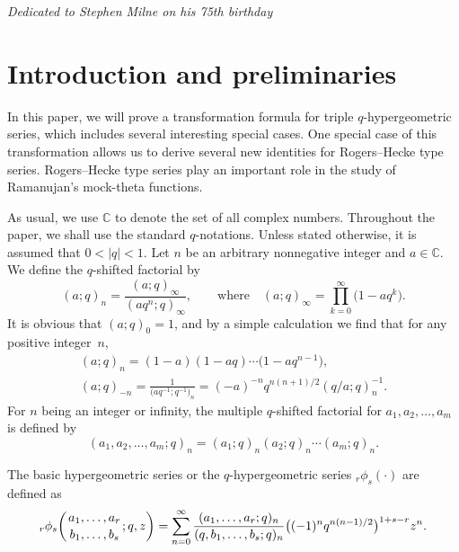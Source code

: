 \documentclass[pdftex]{sigma}
\numberwithin{equation}{section}
\begin{document}
\begin{flushright}
\emph{Dedicated to Stephen Milne on his 75th birthday}
\end{flushright}

\renewcommand{\thefootnote}{\arabic{footnote}}
\setcounter{footnote}{0}

\section{Introduction and preliminaries}

In this paper, we will prove a transformation formula for triple $q$-hypergeometric series, which includes several interesting special cases. One special case of this transformation allows us to derive several new identities for Rogers--Hecke type series. Rogers--Hecke type series play an important role in the study of Ramanujan's mock-theta functions.

As usual, we use $\mathbb{C}$ to denote the set of all complex numbers. Throughout the paper, we shall use the standard $q$-notations. Unless stated otherwise, it is assumed that $0<|q|<1$.
Let $n$ be an arbitrary nonnegative integer and $a \in \mathbb{C}$.
We define the $q$-shifted factorial by
\begin{equation*}
	(a;q)_n=\frac{(a; q)_\infty}{(aq^n; q)_\infty}, \qquad \text{where}\quad
	(a; q)_\infty=\prod_{k=0}^\infty \bigl(1-aq^k\bigr).
\end{equation*}
It is obvious that $(a; q)_0=1$, and by a simple calculation we find that for any positive integer~$n$,
\begin{gather*}
(a; q)_n=(1-a)(1-aq)\cdots \bigl(1-aq^{n-1}\bigr),\\
(a; q)_{-n}=\frac{1}{\bigl(aq^{-1}; q^{-1}\bigr)_n}=(-a)^{-n} q^{n(n+1)/2} (q/a; q)_n^{-1}.
\end{gather*}
For $n$ being an integer or infinity, the multiple
$q$-shifted factorial for $a_1, a_2, \ldots, a_m $ is defined by
\begin{equation*}
(a_1, a_2,\dots ,a_m;q)_n=(a_1;q)_n(a_2;q)_n \cdots (a_m;q)_n.
\end{equation*}

The basic hypergeometric series or the $q$-hypergeometric series ${_{r}\phi_s}(\cdot)$ are defined as
\begin{equation*}
_{r}\phi_s \biggl({{a_1, \ldots, a_{r}} \atop {b_1, \ldots,
b_s}} ; q, z \biggr) =\sum_{n=0}^\infty
\frac{(a_1, \ldots, a_r; q)_n}{(q, b_1, \ldots, b_s; q)_n}
\bigl((-1)^n q^{n(n-1)/2}\bigr)^{1+s-r}z^n.
\end{equation*}
\end{document}
